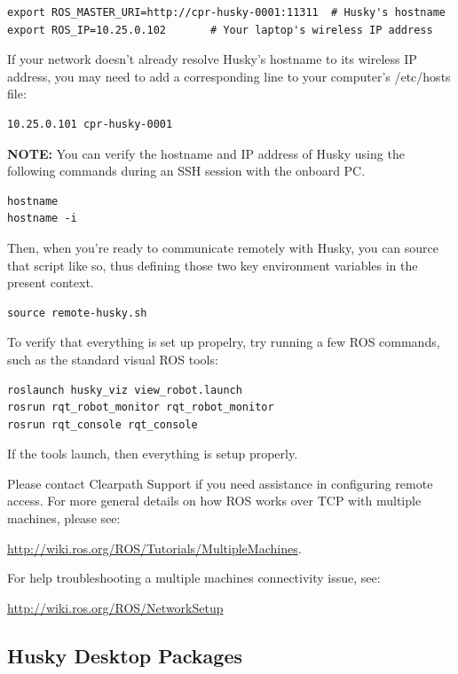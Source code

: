 \documentclass[]{clearpath-latex/clearpath-manual}
\begin{document}
\begin{lstlisting}
export ROS_MASTER_URI=http://cpr-husky-0001:11311  # Husky's hostname
export ROS_IP=10.25.0.102       # Your laptop's wireless IP address
\end{lstlisting}

If your network doesn’t already resolve Husky’s hostname to its wireless IP address, you may need to add a corresponding line to your computer’s /etc/hosts file:

\begin{lstlisting}
10.25.0.101 cpr-husky-0001
\end{lstlisting}

\textbf{NOTE:} You can verify the hostname and IP address of Husky using the following commands during an SSH session with the onboard PC.

\begin{lstlisting}
hostname
hostname -i
\end{lstlisting}

Then, when you’re ready to communicate remotely with Husky, you can source that script like so, thus defining those two key environment variables in the present context.

\begin{lstlisting}
source remote-husky.sh
\end{lstlisting}

To verify that everything is set up propelry, try running a few ROS commands, such as the standard visual ROS tools:

\begin{lstlisting}
roslaunch husky_viz view_robot.launch
rosrun rqt_robot_monitor rqt_robot_monitor
rosrun rqt_console rqt_console
\end{lstlisting}

If the tools launch, then everything is setup properly.

Please contact Clearpath Support if you need assistance in configuring remote access. For more general details on how ROS works over TCP with multiple machines, please see:

\url{http://wiki.ros.org/ROS/Tutorials/MultipleMachines}.

For help troubleshooting a multiple machines connectivity issue, see:

\url{http://wiki.ros.org/ROS/NetworkSetup}

\newpage\subsection{Husky Desktop Packages}
\end{document}
